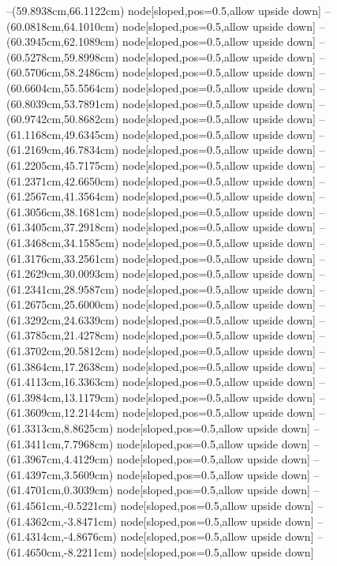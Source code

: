 --(59.8938cm,66.1122cm) node[sloped,pos=0.5,allow upside down]{\ArrowIn}
--(60.0818cm,64.1010cm) node[sloped,pos=0.5,allow upside down]{\ArrowIn}
--(60.3945cm,62.1089cm) node[sloped,pos=0.5,allow upside down]{\ArrowIn}
--(60.5278cm,59.8998cm) node[sloped,pos=0.5,allow upside down]{\ArrowIn}
--(60.5706cm,58.2486cm) node[sloped,pos=0.5,allow upside down]{\ArrowIn}
--(60.6604cm,55.5564cm) node[sloped,pos=0.5,allow upside down]{\ArrowIn}
--(60.8039cm,53.7891cm) node[sloped,pos=0.5,allow upside down]{\ArrowIn}
--(60.9742cm,50.8682cm) node[sloped,pos=0.5,allow upside down]{\ArrowIn}
--(61.1168cm,49.6345cm) node[sloped,pos=0.5,allow upside down]{\ArrowIn}
--(61.2169cm,46.7834cm) node[sloped,pos=0.5,allow upside down]{\ArrowIn}
--(61.2205cm,45.7175cm) node[sloped,pos=0.5,allow upside down]{\ArrowIn}
--(61.2371cm,42.6650cm) node[sloped,pos=0.5,allow upside down]{\ArrowIn}
--(61.2567cm,41.3564cm) node[sloped,pos=0.5,allow upside down]{\ArrowIn}
--(61.3056cm,38.1681cm) node[sloped,pos=0.5,allow upside down]{\ArrowIn}
--(61.3405cm,37.2918cm) node[sloped,pos=0.5,allow upside down]{\arrowIn}
--(61.3468cm,34.1585cm) node[sloped,pos=0.5,allow upside down]{\ArrowIn}
--(61.3176cm,33.2561cm) node[sloped,pos=0.5,allow upside down]{\arrowIn}
--(61.2629cm,30.0093cm) node[sloped,pos=0.5,allow upside down]{\ArrowIn}
--(61.2341cm,28.9587cm) node[sloped,pos=0.5,allow upside down]{\ArrowIn}
--(61.2675cm,25.6000cm) node[sloped,pos=0.5,allow upside down]{\ArrowIn}
--(61.3292cm,24.6339cm) node[sloped,pos=0.5,allow upside down]{\arrowIn}
--(61.3785cm,21.4278cm) node[sloped,pos=0.5,allow upside down]{\ArrowIn}
--(61.3702cm,20.5812cm) node[sloped,pos=0.5,allow upside down]{\arrowIn}
--(61.3864cm,17.2638cm) node[sloped,pos=0.5,allow upside down]{\ArrowIn}
--(61.4113cm,16.3363cm) node[sloped,pos=0.5,allow upside down]{\arrowIn}
--(61.3984cm,13.1179cm) node[sloped,pos=0.5,allow upside down]{\ArrowIn}
--(61.3609cm,12.2144cm) node[sloped,pos=0.5,allow upside down]{\arrowIn}
--(61.3313cm,8.8625cm) node[sloped,pos=0.5,allow upside down]{\ArrowIn}
--(61.3411cm,7.7968cm) node[sloped,pos=0.5,allow upside down]{\ArrowIn}
--(61.3967cm,4.4129cm) node[sloped,pos=0.5,allow upside down]{\ArrowIn}
--(61.4397cm,3.5609cm) node[sloped,pos=0.5,allow upside down]{\arrowIn}
--(61.4701cm,0.3039cm) node[sloped,pos=0.5,allow upside down]{\ArrowIn}
--(61.4561cm,-0.5221cm) node[sloped,pos=0.5,allow upside down]{\arrowIn}
--(61.4362cm,-3.8471cm) node[sloped,pos=0.5,allow upside down]{\ArrowIn}
--(61.4314cm,-4.8676cm) node[sloped,pos=0.5,allow upside down]{\ArrowIn}
--(61.4650cm,-8.2211cm) node[sloped,pos=0.5,allow upside down]{\ArrowIn}
